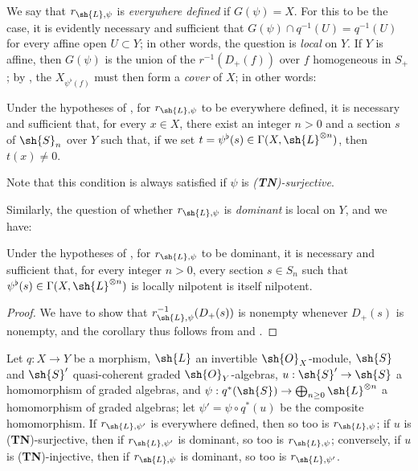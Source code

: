 We say that $r_{\sh{L},\psi}$ is \emph{everywhere defined} if $G(\psi)=X$.
For this to be the case, it is evidently necessary and sufficient that $G(\psi)\cap q^{-1}(U)=q^{-1}(U)$ for every affine open $U\subset Y$;
in other words, the question is \emph{local} on $Y$.
If $Y$ is affine, then $G(\psi)$ is the union of the $r^{-1}(D_+(f))$ over $f$ homogeneous in $S_+$ ;
by , the $X_{\psi^\flat(f)}$ must then form a \emph{cover} of $X$;
in other words:

\begin{corollary}[3.7.4]
\label{II.3.7.4}
Under the hypotheses of , for $r_{\sh{L},\psi}$ to be everywhere defined, it is necessary and sufficient that, for every $x\in X$, there exist an integer $n>0$ and a section $s$ of $\sh{S}_n$ over $Y$ such that, if we set $t=\psi^\flat(s)\in\Gamma(X,\sh{L}^{\otimes n})$, then $t(x)\neq0$.
\end{corollary}

Note that this condition is always satisfied if $\psi$ is \emph{(\textbf{TN})-surjective}.

Similarly, the question of whether $r_{\sh{L},\psi}$ is \emph{dominant} is local on $Y$, and we have:

\begin{corollary}[3.7.5]
\label{II.3.7.5}
Under the hypotheses of , for $r_{\sh{L},\psi}$ to be dominant, it is necessary and sufficient that, for every integer $n>0$, every section $s\in S_n$ such that $\psi^\flat(s)\in\Gamma(X,\sh{L}^{\otimes n})$ is locally nilpotent is itself nilpotent.
\end{corollary}

\begin{proof}
We have to show that $r_{\sh{L},\psi}^{-1}(D_+(s))$ is nonempty whenever $D_+(s)$ is nonempty, and the corollary thus follows from  and .
\end{proof}

\begin{proposition}[3.7.6]
\label{II.3.7.6}
Let $q:X\to Y$ be a morphism, $\sh{L}$ an invertible $\sh{O}_X$-module, $\sh{S}$ and $\sh{S}'$ quasi-coherent graded $\sh{O}_Y$-algebras, $u:\sh{S}'\to\sh{S}$ a homomorphism of graded algebras, and $\psi:q^*(\sh{S})\to\bigoplus_{n\geq0}\sh{L}^{\otimes n}$ a homomorphism of graded algebras;
let $\psi'=\psi\circ q^*(u)$ be the composite homomorphism.
If $r_{\sh{L},\psi'}$ is everywhere defined, then so too is $r_{\sh{L},\psi}$;
if $u$ is (\textbf{TN})-surjective, then if $r_{\sh{L},\psi'}$ is dominant, so too is $r_{\sh{L},\psi}$;
conversely, if $u$ is (\textbf{TN})-injective, then if $r_{\sh{L},\psi}$ is dominant, so too is $r_{\sh{L},\psi'}$.
\end{proposition}

